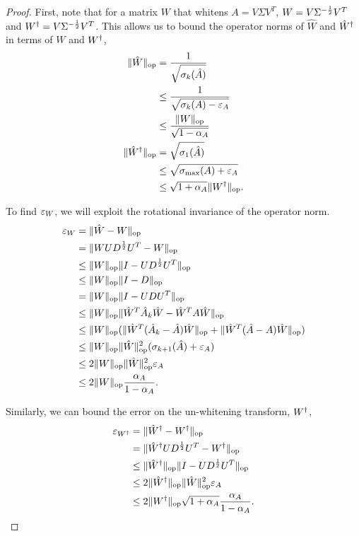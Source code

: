 \begin{proof}
  First, note that for a matrix $W$ that whitens $A = V \Sigma V^T$,
  $W = V \Sigma^{-\half} V^T$ and $\Winv = V \Sigma^{-\half} V^T$.
  This allows us to bound the operator norms of $\hat W$ and $\Whinv$ in
  terms of $W$ and $\Winv$,
  \begin{align*}
    \|\hat W\|_\op &= \frac{1}{\sqrt{\sigma_k(\hat A)}} \\
    &\le \frac{1}{\sqrt{\sigma_k({A}) - \aerr{A}} } \comment{By Weyl's Theorem} \\
    &\le \frac{\|W\|_\op}{\sqrt{1 - \serr{A}} } \\
    \|\Whinv\|_\op &= \sqrt{\sigma_1(\hat A)} \\
    &\le \sqrt{\sigmamax({A}) + \aerr{A}}  \comment{By Weyl's Theorem} \\
    &\le \sqrt{1 + \serr{A}} \|\Winv\|_\op.
  \end{align*}

  To find $\aerr{W}$, we will exploit the rotational invariance of the operator norm. 
  \begin{align*}
    \aerr{W} &= \| \Wp - W \|_\op \\
    &= \| W U D^{\half} U^T - W \|_\op  \comment{$W = U D^{-\half} U^T$}\\
    &\le \|W\|_\op \| I - U D^{\half} U^T \|_\op \comment{Sub-multiplicativity}\\
    &\le \|W\|_\op \| I - D \|_\op \\
    &= \|W\|_\op \| I - U D U^T \|_\op \comment{Rotational invariance}\\
    &\le \|W\|_\op \| \Wp^T \Ap_k \Wp - \Wp^T A \Wp \|_\op \comment{By definition}\\
    &\le \|W\|_\op ( \| \Wp^T (\Ap_k - \Ap) \Wp \|_\op + \| \Wp^T (\Ap - A) \Wp \|_\op) \\
    &\le \|W\|_\op \|\Wp\|_\op^2 (\sigma_{k+1}(\Ap) + \aerr{A}) \\
    &\le 2 \|W\|_\op \|\Wp\|_\op^2 \aerr{A}  \comment{Since $\sigma_{k+1}(A) = 0$}\\
    &\le 2 \|W\|_\op \frac{\serr{A}}{1 - \serr{A}} \comment{Using bound on $\|\hat W\|_\op$}.
  \end{align*}

  Similarly, we can bound the error on the un-whitening transform, $\Winv$,
  \begin{align*}
    \aerr{\pinv{W}} &= \| \pinv{\Wp} - \pinv{W} \|_\op \\
    &= \| \pinv{\Wp} U D^{\half} U^T - \pinv{W} \|_\op \\
    &\le \|\pinv{\Wp}\|_\op \| I - U D^{\half} U^T \|_\op \\
    &\le 2 \|\pinv{\Wp}\|_\op \|\Wp\|_\op^2 \aerr{A} \comment{From derivation of $\aerr{W}$}\\
    &\le 2 \|\Winv\|_\op \sqrt{1 + \serr{A}} \frac{\serr{A}}{1 - \serr{A}}.
  \end{align*}
\end{proof}



